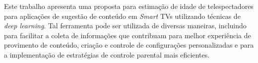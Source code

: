 
  Este trabalho apresenta uma proposta para estimação de idade de telespectadores para aplicações de sugestão de conteúdo em \emph{Smart} TVs utilizando técnicas de \emph{deep learning}. Tal ferramenta pode ser utilizada de diversas maneiras, incluindo para facilitar a coleta de informações que contribuam para melhor experiência de provimento de conteúdo, criação e controle de configurações personalizadas e para a implementação de estratégias de controle parental mais eficientes.
